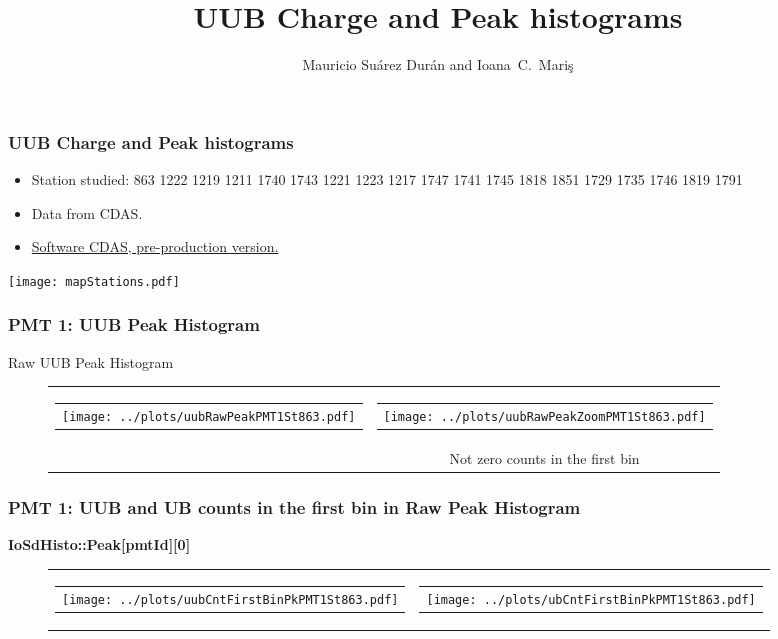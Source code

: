 \documentclass[aspectratio=169]{beamer}
\title{UUB Charge and Peak histograms}
\author{
  Mauricio Su\'arez Dur\'an and Ioana~C.~Mari\c{s}
}
\institute{IIHE-ULB}
\begin{document}
\begin{frame}
  \titlepage
\end{frame}


\begin{frame}
	\frametitle{UUB Charge and Peak histograms}
	\begin{itemize}
		\item Station studied: 863 1222 1219 1211 1740 1743 1221 1223 1217 1747 1741 1745 1818 1851 1729 1735 1746 1819 1791
		\item Data from CDAS.
		\item {\underline {Software CDAS, pre-production version.}}
	\end{itemize}
	\centering
	\texttt{[image: mapStations.pdf]}
\end{frame}



\begin{frame}
	\frametitle{PMT 1: UUB Peak Histogram}
	Raw UUB Peak Histogram
	\begin{figure}
		\centering
		\begin{tabularx}{\textwidth}{CC}
			\begin{tabular}{l}
				\texttt{[image: ../plots/uubRawPeakPMT1St863.pdf]}
			\end{tabular}
			&
			\begin{tabular}{l}
				\texttt{[image: ../plots/uubRawPeakZoomPMT1St863.pdf]}
			\end{tabular}
			\\
			& Not zero counts in the first bin
		\end{tabularx}
	\end{figure}
\end{frame}

\begin{frame}
	\frametitle{PMT 1: UUB and UB counts in the first bin in Raw Peak Histogram}
	{\bf IoSdHisto::Peak[pmtId][0]}
	\begin{figure}
		\centering
		\begin{tabularx}{\textwidth}{CC}
			\begin{tabular}{l}
				\texttt{[image: ../plots/uubCntFirstBinPkPMT1St863.pdf]}
			\end{tabular}
			&
			\begin{tabular}{l}
				\texttt{[image: ../plots/ubCntFirstBinPkPMT1St863.pdf]}
			\end{tabular}
		\end{tabularx}
	\end{figure}
\end{frame}
\end{document}
